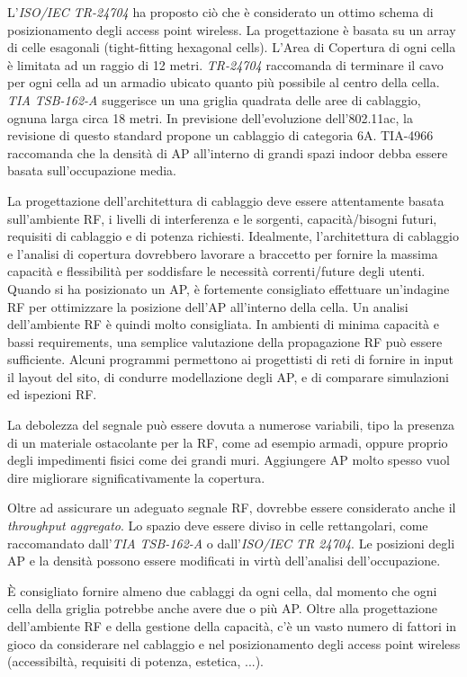 L'\textit{ISO/IEC TR-24704} ha proposto ciò che è considerato un ottimo schema di posizionamento degli access point wireless. La progettazione è basata su un array di celle esagonali (tight-fitting hexagonal cells). L'Area di Copertura di ogni cella è limitata ad un raggio di 12 metri. \textit{TR-24704} raccomanda di terminare il cavo per ogni cella ad un armadio ubicato quanto più possibile al centro della cella.
\textit{TIA TSB-162-A} suggerisce un una griglia quadrata delle aree di cablaggio, ognuna larga circa 18 metri. In previsione dell'evoluzione dell'802.11ac, la revisione di questo standard propone un cablaggio di categoria 6A.
TIA-4966 raccomanda che la densità di AP all'interno di grandi spazi indoor debba essere basata sull'occupazione media.

La progettazione dell'architettura di cablaggio deve essere attentamente basata sull'ambiente RF, i livelli di interferenza e le sorgenti, capacità/bisogni futuri, requisiti di cablaggio e di potenza richiesti. Idealmente, l'architettura di cablaggio e l'analisi di copertura dovrebbero lavorare a braccetto per fornire la massima capacità e flessibilità per soddisfare le necessità correnti/future degli utenti. Quando si ha posizionato un AP, è fortemente consigliato effettuare un'indagine RF per ottimizzare la posizione dell'AP all'interno della cella. Un analisi dell'ambiente RF è quindi molto consigliata. In ambienti di minima capacità e bassi requirements, una semplice valutazione della propagazione RF può essere sufficiente. Alcuni programmi permettono ai progettisti di reti di fornire in input il layout del sito, di condurre modellazione degli AP, e di comparare simulazioni ed ispezioni RF.

La debolezza del segnale può essere dovuta a numerose variabili, tipo la presenza di un materiale ostacolante per la RF, come ad esempio armadi, oppure proprio degli impedimenti fisici come dei grandi muri. Aggiungere AP molto spesso vuol dire migliorare significativamente la copertura.

Oltre ad assicurare un adeguato segnale RF, dovrebbe essere considerato anche il \textit{throughput aggregato}. Lo spazio deve essere diviso in celle rettangolari, come raccomandato dall'\textit{TIA TSB-162-A} o dall'\textit{ISO/IEC TR 24704}. Le posizioni degli AP e la densità possono essere modificati in virtù dell'analisi dell'occupazione.

\`E consigliato fornire almeno due cablaggi da ogni cella, dal momento che ogni cella della griglia potrebbe anche avere due o più AP. Oltre alla progettazione dell'ambiente RF e della gestione della capacità, c'è un vasto numero di fattori in gioco da considerare nel cablaggio e nel posizionamento degli access point wireless (accessibiltà, requisiti di potenza, estetica, ...).

